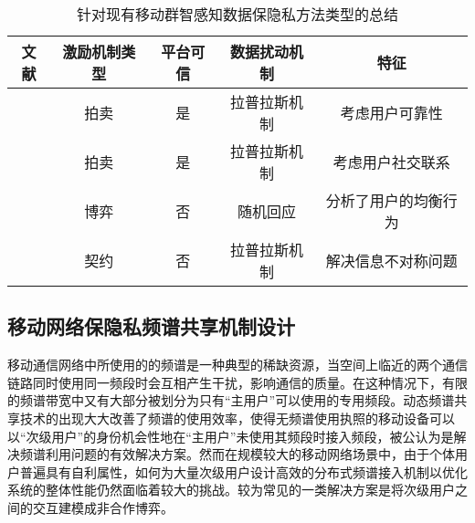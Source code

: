 \begin{table}[!htp]
	\caption{针对现有移动群智感知数据保隐私方法类型的总结}
	\centering
	\tabcolsep=10pt
	\begin{tabular}[c]{|c|c|c|c|c|}
		\hline \label{table:comparison}
		\textbf{文献} & \textbf{激励机制类型} & \textbf{平台可信} &  \textbf{数据扰动机制} & \textbf{特征} \\ \hline
		
		\cite{jin2016inception}  & 拍卖  &   是  &	拉普拉斯机制 & 考虑用户可靠性 \\ \hline

		
		\cite{zhang2016privacy}  & 拍卖  &   是  & 拉普拉斯机制  & 考虑用户社交联系 \\ \hline

		\cite{wang2016value}  & 博弈 &    否   &   随机回应 & 分析了用户的均衡行为	\\ \hline

		\cite{Kun1}  & 契约  & 否  & 拉普拉斯机制 & 解决信息不对称问题 \\ \hline

	\end{tabular}
\end{table}




\subsection{移动网络保隐私频谱共享机制设计}

移动通信网络中所使用的的频谱是一种典型的稀缺资源，当空间上临近的两个通信链路同时使用同一频段时会互相产生干扰，影响通信的质量。在这种情况下，有限的频谱带宽中又有大部分被划分为只有“主用户”可以使用的专用频段。动态频谱共享技术的出现大大改善了频谱的使用效率，使得无频谱使用执照的移动设备可以以“次级用户”的身份机会性地在“主用户”未使用其频段时接入频段，被公认为是解决频谱利用问题的有效解决方案。然而在规模较大的移动网络场景中，由于个体用户普遍具有自利属性，如何为大量次级用户设计高效的分布式频谱接入机制以优化系统的整体性能仍然面临着较大的挑战。较为常见的一类解决方案是将次级用户之间的交互建模成非合作博弈\cite{wang2010game, chen2012spatial}。

